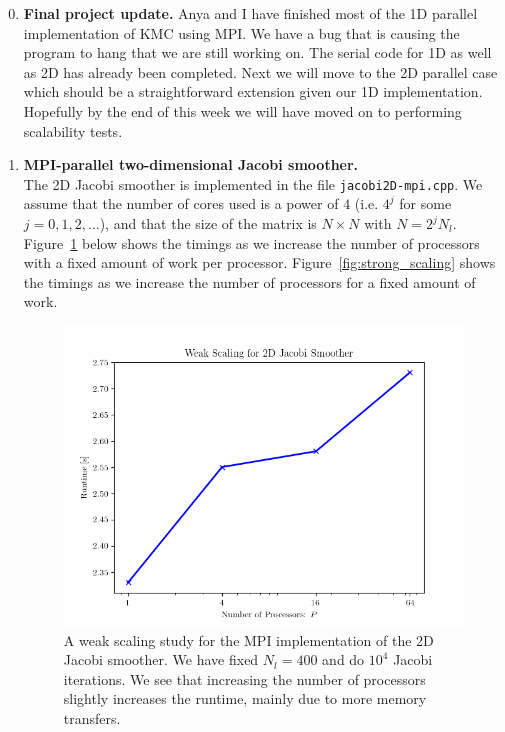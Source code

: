 \documentclass[12pt]{article}
\begin{document}
\begin{enumerate}
\setcounter{enumi}{-1}

  
\item {\bf Final project update.} Anya and I have finished most of the 1D parallel implementation of KMC using MPI.  We have a bug that is causing the program to hang that we are still working on.  The serial code for 1D as well as 2D has already been completed.  Next we will move to the 2D parallel case which should be a straightforward extension given our 1D implementation.  Hopefully by the end of this week we will have moved on to performing scalability tests.




\item {\bf MPI-parallel two-dimensional Jacobi smoother.} \\
The 2D Jacobi smoother is implemented in the file \texttt{jacobi2D-mpi.cpp}.  We assume that the number of cores used is a power of $4$ (i.e. $4^j$ for some $j = 0,1,2,\ldots$), and that the size of the matrix is $N\times N$ with $N = 2^j N_l$.  Figure~\ref{fig:weak_scaling} below shows the timings as we increase the number of processors with a fixed amount of work per processor.  Figure~\ref{fig:strong_scaling} shows the timings as we increase the number of processors for a fixed amount of work.


\begin{figure}[H]
\begin{center}
\includegraphics[width=5in]{weak_scaling.png}
\end{center}
\caption{A weak scaling study for the MPI implementation of the 2D Jacobi smoother.  We have fixed $N_l = 400$ and do $10^4$ Jacobi iterations.  We see that increasing the number of processors slightly increases the runtime, mainly due to more memory transfers.}
\label{fig:weak_scaling}
\end{figure}


\end{enumerate}
\end{document}

